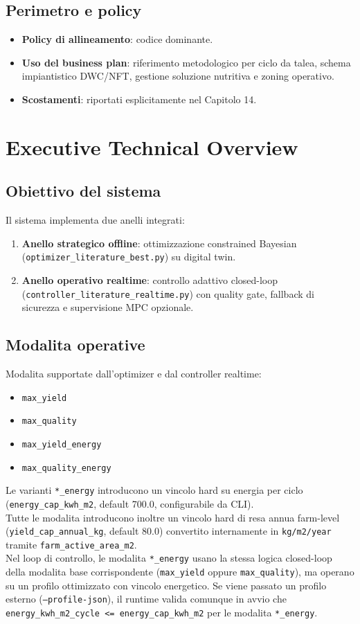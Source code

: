 ﻿\documentclass[11pt,a4paper]{report}
\begin{document}
\section{Perimetro e policy}
\begin{itemize}
  \item \textbf{Policy di allineamento}: codice dominante.
  \item \textbf{Uso del business plan}: riferimento metodologico per ciclo da talea, schema impiantistico DWC/NFT, gestione soluzione nutritiva e zoning operativo.
  \item \textbf{Scostamenti}: riportati esplicitamente nel Capitolo 14.
\end{itemize}

\newpage
\chapter{Executive Technical Overview}

\section{Obiettivo del sistema}
Il sistema implementa due anelli integrati:
\begin{enumerate}
  \item \textbf{Anello strategico offline}: ottimizzazione constrained Bayesian (\texttt{optimizer\_literature\_best.py}) su digital twin.
  \item \textbf{Anello operativo realtime}: controllo adattivo closed-loop (\texttt{controller\_literature\_realtime.py}) con quality gate, fallback di sicurezza e supervisione MPC opzionale.
\end{enumerate}

\section{Modalita operative}
Modalita supportate dall'optimizer e dal controller realtime:
\begin{itemize}
  \item \texttt{max\_yield}
  \item \texttt{max\_quality}
  \item \texttt{max\_yield\_energy}
  \item \texttt{max\_quality\_energy}
\end{itemize}
Le varianti \texttt{*\_energy} introducono un vincolo hard su energia per ciclo
(\texttt{energy\_cap\_kwh\_m2}, default 700.0, configurabile da CLI).\\
Tutte le modalita introducono inoltre un vincolo hard di resa annua farm-level
(\texttt{yield\_cap\_annual\_kg}, default 80.0) convertito internamente in
\texttt{kg/m2/year} tramite \texttt{farm\_active\_area\_m2}.\\
Nel loop di controllo, le modalita \texttt{*\_energy} usano la stessa logica closed-loop della modalita base corrispondente
(\texttt{max\_yield} oppure \texttt{max\_quality}), ma operano su un profilo ottimizzato con vincolo energetico.
Se viene passato un profilo esterno (\texttt{--profile-json}), il runtime valida comunque in avvio che
\texttt{energy\_kwh\_m2\_cycle <= energy\_cap\_kwh\_m2} per le modalita \texttt{*\_energy}.
\end{document}
